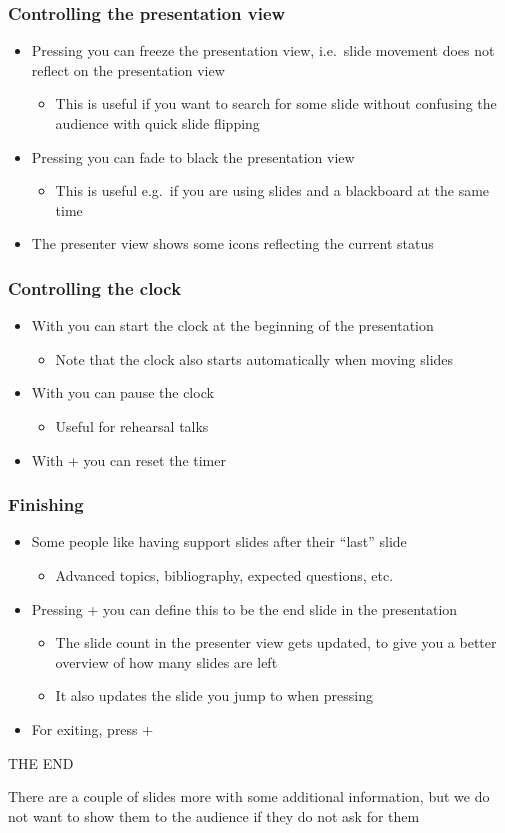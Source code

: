 \documentclass{beamer}
\newcommand{\singleitem}[1]{\begin{itemize}\item #1\end{itemize}}
\begin{document}
\begin{frame}
  \frametitle{Controlling the presentation view}
    \begin{itemize}
      \item Pressing  you can freeze the presentation view, i.e.\
        slide movement does not reflect on the presentation view
        \singleitem{This is useful if you want to search for some slide without
        confusing the audience with quick slide flipping}
      \item Pressing  you can fade to black the presentation view
        \singleitem{This is useful e.g.\ if you are using slides and a
        blackboard at the same time}
      \item The presenter view shows some icons reflecting the current status
    \end{itemize}
\end{frame}

\begin{frame}
  \frametitle{Controlling the clock}
  \begin{itemize}
    \item With  you can start the clock at the beginning of the
      presentation
      \singleitem{Note that the clock also starts automatically when moving
        slides}
    \item With  you can pause the clock
      \singleitem{Useful for rehearsal talks}
    \item With \Ctrl+ you can reset the timer
  \end{itemize}
\end{frame}

\begin{frame}
  \frametitle{Finishing}
  \begin{itemize}
    \item Some people like having support slides after their ``last'' slide
      \singleitem{Advanced topics, bibliography, expected questions, etc.}
    \item Pressing \Ctrl+\keystroke{E} you can define this to be the end slide
      in the presentation
      \singleitem{The slide count in the presenter view gets updated, to give
        you a better overview of how many slides are left}
      \singleitem{It also updates the slide you jump to when pressing \End}
    \item For exiting, press \Ctrl+\keystroke{Q}
  \end{itemize}
  \vfill
  \begin{center}
    THE END
  \end{center}
  \vfill
  {\footnotesize There are a couple of slides more with some additional
    information, but we do not want to show them to the audience if they do not
    ask for them}
\end{frame}
\end{document}
